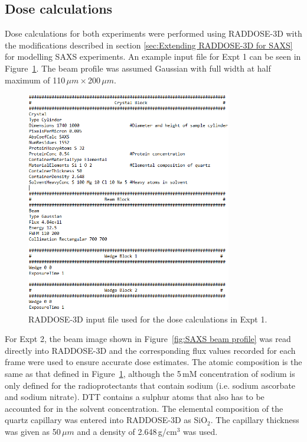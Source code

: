 \subsection{Dose calculations}
\label{sub:Dose calculation}
Dose calculations for both experiments were performed using RADDOSE-3D with the modifications described in section \ref{sec:Extending RADDOSE-3D for SAXS} for modelling SAXS experiments.
An example input file for Expt 1 can be seen in Figure~\ref{fig:SAXS example input - Rebecca}.
The beam profile was assumed Gaussian with full width at half maximum of 110$\,\mu m \times $200$\,\mu m$.
\begin{figure}
    \centering
    \includegraphics[width=0.8\textwidth]{figures/saxs/rebecca_raddose_input.png}
    \caption[RADDOSE-3D input file used for the dose calculations in Expt 1.]{RADDOSE-3D input file used for the dose calculations in Expt 1.}
    \label{fig:SAXS example input - Rebecca}
\end{figure}
For Expt 2, the beam image shown in Figure~\ref{fig:SAXS beam profile} was read directly into RADDOSE-3D and the corresponding flux values recorded for each frame were used to ensure accurate dose estimates.
The atomic composition is the same as that defined in Figure~\ref{fig:SAXS example input - Rebecca}, although the 5\,mM concentration of sodium is only defined for the radioprotectants that contain sodium (i.e. sodium ascorbate and sodium nitrate).
DTT contains a sulphur atoms that also has to be accounted for in the solvent concentration.
The elemental composition of the quartz capillary was entered into RADDOSE-3D as SiO$_{\text{2}}$.
The capillary thickness was given as 50$\,\mu m$ and a density of 2.648$\,$g/cm$^{\text{3}}$ was used.
